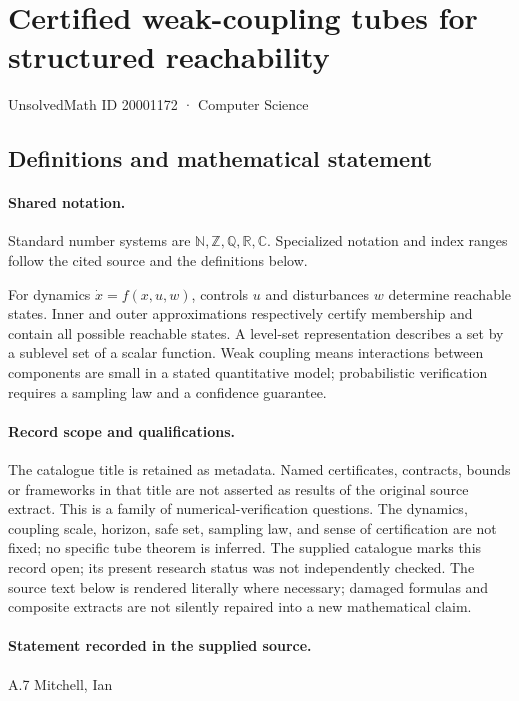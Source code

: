 \documentclass[11pt]{article}
\begin{document}
\setcounter{section}{20001171}
\section{Certified weak-coupling tubes for structured reachability}\label{20001172}
{\small\sffamily UnsolvedMath ID 20001172 · Computer Science}
\subsection{Definitions and mathematical statement}

\paragraph{Shared notation.}Standard number systems are $\mathbb N,\mathbb Z,\mathbb Q,\mathbb R,\mathbb C$. Specialized notation and index ranges follow the cited source and the definitions below.


For dynamics $\dot x=f(x,u,w)$, controls $u$ and disturbances $w$ determine reachable states. Inner and outer approximations respectively certify membership and contain all possible reachable states. A level-set representation describes a set by a sublevel set of a scalar function. Weak coupling means interactions between components are small in a stated quantitative model; probabilistic verification requires a sampling law and a confidence guarantee.
\paragraph{Record scope and qualifications.}
The catalogue title is retained as metadata. Named certificates, contracts, bounds or frameworks in that title are not asserted as results of the original source extract.
This is a family of numerical-verification questions. The dynamics, coupling scale, horizon, safe set, sampling law, and sense of certification are not fixed; no specific tube theorem is inferred. The supplied catalogue marks this record open; its present research status was not independently checked.
The source text below is rendered literally where necessary; damaged formulas and composite extracts are not silently repaired into a new mathematical claim.
\paragraph{Statement recorded in the supplied source.}
A.7 Mitchell, Ian
\end{document}
